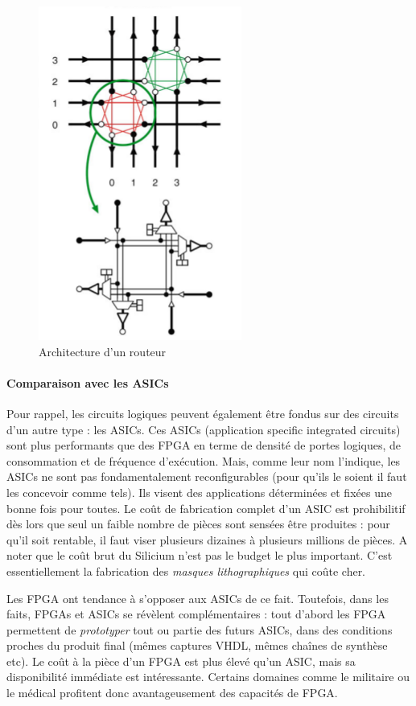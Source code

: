 \begin{figure}[h!]
  \centering
  \includegraphics[scale=0.4]{./figures/switch_box_directional.png}
  \caption{Architecture d'un routeur}
  \label{fig:router}
\end{figure}


\paragraph{Comparaison avec les ASICs} Pour rappel, les circuits logiques peuvent également être fondus sur des circuits d'un autre type : les ASICs.
Ces ASICs (application specific integrated circuits) sont plus performants que des FPGA en terme de densité de portes logiques, de consommation et de fréquence
d'exécution. Mais, comme leur nom l'indique, les ASICs ne sont pas fondamentalement reconfigurables (pour qu'ils le soient il faut les concevoir comme tels).
Ils visent des applications déterminées et fixées une bonne fois pour toutes. Le coût de fabrication complet d'un ASIC est prohibilitif dès lors que seul un
faible nombre de pièces sont sensées être produites : pour qu'il soit rentable, il faut viser plusieurs dizaines à plusieurs millions de pièces. A noter que
le coût brut du Silicium n'est pas le budget le plus important. C'est essentiellement la fabrication des {\it masques lithographiques} qui coûte cher.

Les FPGA ont tendance à s'opposer aux ASICs de ce fait. Toutefois, dans les faits,
FPGAs et ASICs se révèlent complémentaires : tout d'abord les FPGA permettent de {\it prototyper} tout ou partie des futurs ASICs,
dans des conditions proches du produit final (mêmes captures VHDL, mêmes chaînes de synthèse etc). Le coût à la pièce d'un FPGA
est plus élevé qu'un ASIC, mais sa disponibilité immédiate est intéressante. Certains domaines comme le militaire ou le médical profitent donc
avantageusement des capacités de FPGA.

